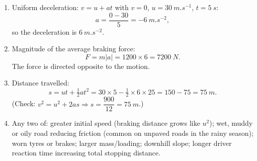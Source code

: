 \documentclass[11pt]{article}
\begin{document}
\begin{corrige}
\begin{enumerate}
\item Uniform deceleration: $v=u+at$ with $v=0$, $u=\SI{30}{m.s^{-1}}$, $t=\SI{5}{s}$:
\[ a=\dfrac{0-30}{5}=-\SI{6}{m.s^{-2}}, \]
so the deceleration is $\SI{6}{m.s^{-2}}$.
\item Magnitude of the average braking force:
\[ F=m|a|=1200\times 6=\SI{7200}{N}. \]
The force is directed opposite to the motion.
\item Distance travelled:
\[ s=ut+\tfrac12 at^2=30\times 5-\tfrac12\times 6\times 25=150-75=\SI{75}{m}. \]
(Check: $v^2=u^2+2as \Rightarrow s=\dfrac{900}{12}=\SI{75}{m}$.)
\item Any two of: greater initial speed (braking distance grows like $u^2$); wet, muddy or oily road reducing friction (common on unpaved roads in the rainy season); worn tyres or brakes; larger mass/loading; downhill slope; longer driver reaction time increasing total stopping distance.
\end{enumerate}
\end{corrige}
\end{document}
